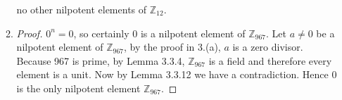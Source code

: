 \documentclass[10pt]{article}
\begin{document}
\begin{enumerate}
\begin{enumerate}
              no other nilpotent elements of $\mathbb{Z}_{12}$.
            \item
              \begin{proof}
                $0^n = 0$, so certainly $0$ is a nilpotent element of
                $\mathbb{Z}_{967}$. Let $a \not= 0$ be a nilpotent element
                of $\mathbb{Z}_{967}$, by the proof in 3.(a), $a$ is a zero
                divisor. Because 967 is prime, by Lemma 3.3.4,
                $\mathbb{Z}_{967}$ is a field and therefore every element is a
                unit. Now by Lemma 3.3.12 we have a contradiction. Hence 0 is
                the only nilpotent element $\mathbb{Z}_{967}$.
              \end{proof}
          \end{enumerate}
    \end{enumerate}
\end{document}
